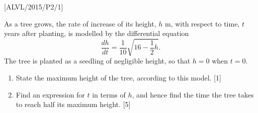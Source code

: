 \item {[}ALVL/2015/P2/1{]}

As a tree grows, the rate of increase of its height, $h$ m, with
respect to time, $t$ years after planting, is modelled by the differential
equation 
\[
\frac{dh}{dt}=\frac{1}{10}\sqrt{16-\frac{1}{2}h}.
\]
The tree is planted as a seedling of negligible height, so that $h=0$
when $t=0$. 
\begin{enumerate}
\item State the maximum height of the tree, according to this model. \hfill{}
{[}1{]}
\item Find an expression for $t$ in terms of $h$, and hence find the time
the tree takes to reach half its maximum height. \hfill{}{[}5{]}
\end{enumerate}
